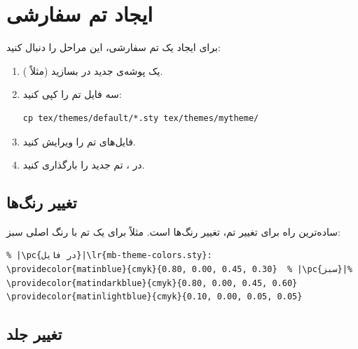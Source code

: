 \section{ایجاد تم سفارشی}
\label{sec:themes-creating}

برای ایجاد یک تم سفارشی، این مراحل را
دنبال کنید:

\begin{enumerate}
    \item یک پوشه‌ی جدید در
     بسازید (مثلاً
    ).

    \item سه فایل تم را کپی کنید:

    \begin{latin}
\begin{verbatim}
cp tex/themes/default/*.sty tex/themes/mytheme/
\end{verbatim}
    \end{latin}

    \item فایل‌های تم را ویرایش کنید.

    \item در ، تم جدید را
    بارگذاری کنید.
\end{enumerate}


\subsection{تغییر رنگ‌ها}
\label{sec:themes-custom-colors}

ساده‌ترین راه برای تغییر تم، تغییر رنگ‌ها
است. مثلاً برای یک تم با رنگ اصلی سبز:

\begin{latin}
\begin{verbatim}
% |\pc{در فایل}|\lr{mb-theme-colors.sty}:
\providecolor{matinblue}{cmyk}{0.80, 0.00, 0.45, 0.30}  % |\pc{سبز}|%
\providecolor{matindarkblue}{cmyk}{0.80, 0.00, 0.45, 0.60}
\providecolor{matinlightblue}{cmyk}{0.10, 0.00, 0.05, 0.05}
\end{verbatim}
\end{latin}


\subsection{تغییر جلد}
\label{sec:themes-custom-cover}

